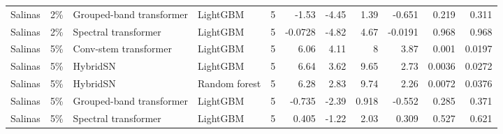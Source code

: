 \begin{table}
\begin{tabular}{llllrrrrrrr}
Salinas & 2\% & Grouped-band transformer & LightGBM & 5 & -1.53 & -4.45 & 1.39 & -0.651 & 0.219 & 0.311 \\
Salinas & 2\% & Spectral transformer & LightGBM & 5 & -0.0728 & -4.82 & 4.67 & -0.0191 & 0.968 & 0.968 \\
Salinas & 5\% & Conv-stem transformer & LightGBM & 5 & 6.06 & 4.11 & 8 & 3.87 & 0.001 & 0.0197 \\
Salinas & 5\% & HybridSN & LightGBM & 5 & 6.64 & 3.62 & 9.65 & 2.73 & 0.0036 & 0.0272 \\
Salinas & 5\% & HybridSN & Random forest & 5 & 6.28 & 2.83 & 9.74 & 2.26 & 0.0072 & 0.0376 \\
Salinas & 5\% & Grouped-band transformer & LightGBM & 5 & -0.735 & -2.39 & 0.918 & -0.552 & 0.285 & 0.371 \\
Salinas & 5\% & Spectral transformer & LightGBM & 5 & 0.405 & -1.22 & 2.03 & 0.309 & 0.527 & 0.621 \\
\bottomrule
\end{tabular}
\end{table}
